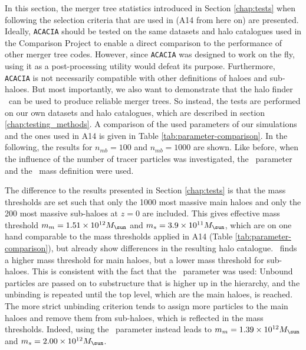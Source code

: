 In this section, the merger tree statistics introduced in Section \ref{chap:tests} when following the selection criteria that are used in \citet{SUSSING_HALOFINDER} (A14 from here on) are presented.
Ideally, \texttt{ACACIA} should be tested on the same datasets and halo catalogues used in the Comparison Project to enable a direct comparison to the performance of other merger tree codes. 
However, since \texttt{ACACIA} was designed to work on the fly, using it as a post-processing utility would defeat its purpose.
Furthermore, \texttt{ACACIA} is not necessarily compatible with other definitions of haloes and sub-haloes.
But most importantly, we also want to demonstrate that the halo finder \phew\ can be used to produce reliable merger trees. 
So instead, the tests are performed on our own datasets and halo catalogues, which are described in section \ref{chap:testing_methods}.
A comparison of the used parameters of our simulations and the ones used in A14 is given in Table \ref{tab:parameter-comparison}.
In the following, the results for $n_{mb} = 100$ and $n_{mb} = 1000$ are shown.
Like before, when the influence of the number of tracer particles was investigated, the \sad\ parameter and the \exc\ mass definition were used.


The difference to the results presented in Section \ref{chap:tests} is that the mass thresholds are set such that only the 1000 most massive main haloes and only the 200 most massive sub-haloes at $z = 0$ are included.
This gives effective mass threshold $m_{m} = 1.51 \times 10^{12} \msol$ and $m_{s} = 3.9 \times 10^{11}\msol$, which are on one hand comparable to the mass thresholds applied in A14 (Table \ref{tab:parameter-comparison}), but already show differences in the resulting halo catalogue.
\phew\ finds a higher mass threshold for main haloes, but a lower mass threshold for sub-haloes.
This is consistent with the fact that the \sad\ parameter was used:
Unbound particles are passed on to substructure that is higher up in the hierarchy, and the unbinding is repeated until the top level, which are the main haloes, is reached.
The more strict unbinding criterion tends to assign more particles to the main haloes and remove them from sub-haloes, which is reflected in the mass thresholds.
Indeed, using the \nosad\ parameter instead leads to $m_m = 1.39 \times 10^{12}\msol$ and $m_s = 2.00 \times 10^{12}\msol$.



